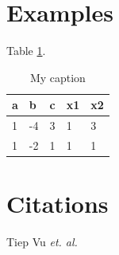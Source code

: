 \documentclass{article}
\begin{document}
\section{Examples} %
\label{sec:examples}
Table \ref{tab:tb1}.
\begin{table}[h]
\centering
\caption{My caption}
\label{tab:tb1}
\begin{tabular}{|l|l|l|l|l|}
\hline
a & b  & c & x1 & x2 \\ \hline
1 & -4 & 3 & 1  & 3  \\ \hline
1 & -2 & 1 & 1  & 1  \\ \hline
\end{tabular}
\end{table}

\section{Citations} %
\label{sec:citations}
Tiep Vu \textit{et. al.} \cite{vu2015dfdl,vu2016histopathological}




\end{document}
